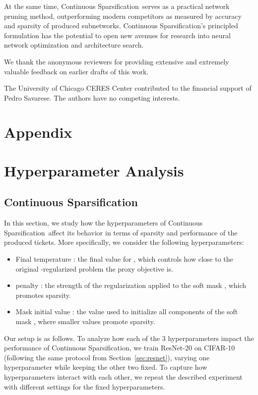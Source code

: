 \documentclass{article}
\newcommand{\method}{Continuous Sparsification}
\begin{document}
At the same time, \method~serves as a practical network pruning method, outperforming modern competitors as measured by accuracy and sparsity of produced subnetworks. \method's principled formulation has the potential to open new avenues for research into neural network optimization and architecture search.
 
\begin{ack}
We thank the anonymous reviewers for providing extensive and extremely valuable feedback on earlier drafts of this work.

The University of Chicago CERES Center contributed to the financial support of Pedro Savarese.  The authors have no competing interests.
\end{ack}




\appendix
\newpage

\section*{Appendix}

\section{Hyperparameter Analysis}
\label{app:analysis}

\subsection{\method}
\label{app:csanalysis}

In this section, we study how the hyperparameters of \method~affect its behavior in terms of sparsity and performance of the produced tickets. More specifically, we consider the following hyperparameters:

\begin{itemize}
    \item Final temperature : the final value for , which controls how close to the original -regularized problem the proxy objective  is.
    \item  penalty : the strength of the  regularization applied to the soft mask , which promotes sparsity.
    \item Mask initial value : the value used to initialize all components of the soft mask , where smaller values promote sparsity.
\end{itemize}

Our setup is as follows. To analyze how each of the 3 hyperparameters impact the performance of \method, we train ResNet-20 on CIFAR-10 (following the same protocol from Section~\ref{sec:resnet}), varying one hyperparameter while keeping the other two fixed. To capture how hyperparameters interact with each other, we repeat the described experiment with different settings for the fixed hyperparameters.
\end{document}
